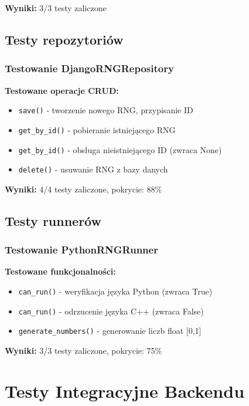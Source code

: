 \documentclass[12pt,a4paper]{article}
\begin{document}
\textbf{Wyniki:} 3/3 testy zaliczone

\newpage

\subsection{Testy repozytoriów}

\subsubsection{Testowanie DjangoRNGRepository}

\textbf{Testowane operacje CRUD:}
\begin{itemize}
    \item \texttt{save()} - tworzenie nowego RNG, przypisanie ID
    \item \texttt{get\_by\_id()} - pobieranie istniejącego RNG
    \item \texttt{get\_by\_id()} - obsługa nieistniejącego ID (zwraca None)
    \item \texttt{delete()} - usuwanie RNG z bazy danych
\end{itemize}

\textbf{Wyniki:} 4/4 testy zaliczone, pokrycie: 88\%

\subsection{Testy runnerów}

\subsubsection{Testowanie PythonRNGRunner}

\textbf{Testowane funkcjonalności:}
\begin{itemize}
    \item \texttt{can\_run()} - weryfikacja języka Python (zwraca True)
    \item \texttt{can\_run()} - odrzucenie języka C++ (zwraca False)
    \item \texttt{generate\_numbers()} - generowanie liczb float [0,1]
\end{itemize}

\textbf{Wyniki:} 3/3 testy zaliczone, pokrycie: 75\%

\newpage

\section{Testy Integracyjne Backendu}
\end{document}

